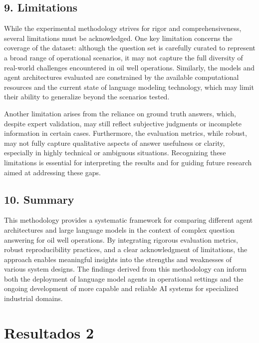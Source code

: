         \subsection{9. Limitations}

            While the experimental methodology strives for rigor and comprehensiveness, several limitations must be acknowledged. One key limitation concerns the coverage of the dataset: although the question set is carefully curated to represent a broad range of operational scenarios, it may not capture the full diversity of real-world challenges encountered in oil well operations. Similarly, the models and agent architectures evaluated are constrained by the available computational resources and the current state of language modeling technology, which may limit their ability to generalize beyond the scenarios tested.

            Another limitation arises from the reliance on ground truth answers, which, despite expert validation, may still reflect subjective judgments or incomplete information in certain cases. Furthermore, the evaluation metrics, while robust, may not fully capture qualitative aspects of answer usefulness or clarity, especially in highly technical or ambiguous situations. Recognizing these limitations is essential for interpreting the results and for guiding future research aimed at addressing these gaps.

        \subsection{10. Summary}

            This methodology provides a systematic framework for comparing different agent architectures and large language models in the context of complex question answering for oil well operations. By integrating rigorous evaluation metrics, robust reproducibility practices, and a clear acknowledgment of limitations, the approach enables meaningful insights into the strengths and weaknesses of various system designs. The findings derived from this methodology can inform both the deployment of language model agents in operational settings and the ongoing development of more capable and reliable AI systems for specialized industrial domains.


    \section{Resultados 2}
        
